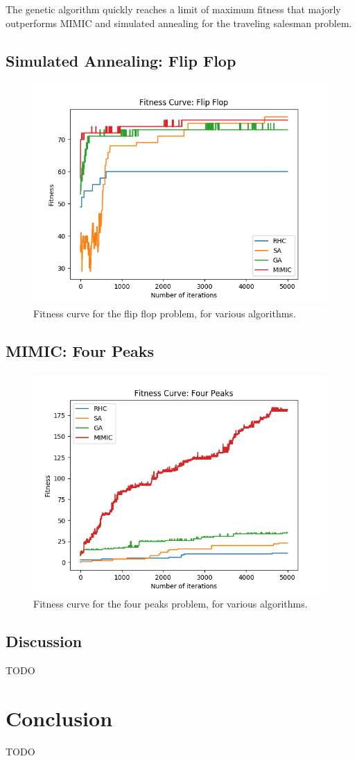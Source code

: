 \documentclass{article}
\begin{document}
      The genetic algorithm quickly reaches a limit of maximum fitness that majorly outperforms MIMIC and simulated annealing for the traveling salesman problem.

    \subsection{Simulated Annealing: Flip Flop}


      \begin{figure}[htb]
      \centering
      \includegraphics[width=.5\linewidth]{out/op/flipflop/fitness.png}
      \caption{Fitness curve for the flip flop problem, for various algorithms.}
      \label{fig:fitness-ff}
      \end{figure}

    \subsection{MIMIC: Four Peaks}


      \begin{figure}[htb]
      \centering
      \includegraphics[width=.5\linewidth]{out/op/fourpeaks/fitness.png}
      \caption{Fitness curve for the four peaks problem, for various algorithms.}
      \label{fig:fitness-fp}
      \end{figure}

    \subsection{Discussion}
      TODO

  \section{Conclusion}
    TODO
\end{document}
